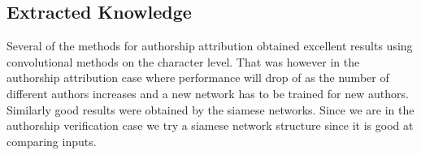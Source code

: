 
\subsection{Extracted Knowledge}

Several of the methods for authorship attribution obtained excellent results
using convolutional methods on the character level. That was however in the
authorship attribution case where performance will drop of as the number of
different authors increases and a new network has to be trained for new authors.
Similarly good results were obtained by the siamese networks. Since we are in
the authorship verification case we try a siamese network structure since it is
good at comparing inputs.
